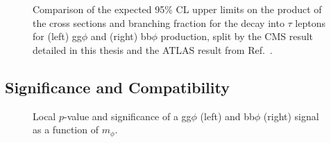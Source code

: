 \begin{figure}[!hbtp]
\centering
\caption{Comparison of the expected 95\% CL upper limits on the product of the cross sections and branching fraction for the decay into $\tau$ leptons for (left) gg$\phi$ and (right) bb$\phi$ production, split by the CMS result detailed in this thesis and the ATLAS result from Ref.~\cite{ATLAS:2020zms}.}
\label{fig:model_independent_limits_by_channel}
\end{figure}

\subsection{Significance and Compatibility}

\begin{figure}[!hbtp]
\centering
\caption{Local $p$-value and significance of a gg$\phi$ (left) and bb$\phi$ (right) signal as a function of $m_{\phi}$.}
\label{fig:significance}
\end{figure}

